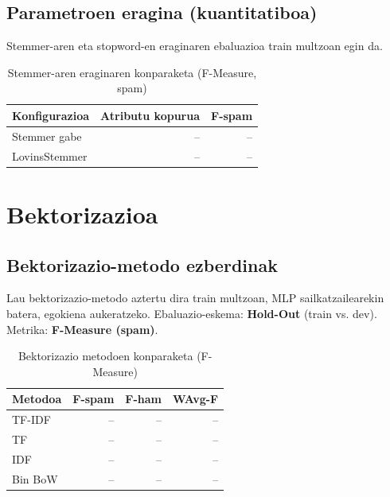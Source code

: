 \documentclass[12pt, a4paper]{article}
\begin{document}
\subsection{Parametroen eragina (kuantitatiboa)}

Stemmer-aren eta stopword-en eraginaren ebaluazioa train multzoan egin da.


\begin{table}[H]
    \centering
    \caption{Stemmer-aren eraginaren konparaketa (F-Measure, spam)}
    \begin{tabular}{lrr}
        \toprule
        \textbf{Konfigurazioa} & \textbf{Atributu kopurua} & \textbf{F-spam} \\
        \midrule
        Stemmer gabe  & -- & -- \\
        LovinsStemmer & -- & -- \\
        \bottomrule
    \end{tabular}
    \label{tab:stemmer}
\end{table}

\newpage
\section{Bektorizazioa}

\subsection{Bektorizazio-metodo ezberdinak}

Lau bektorizazio-metodo aztertu dira train multzoan, MLP sailkatzailearekin batera,
egokiena aukeratzeko. Ebaluazio-eskema: \textbf{Hold-Out} (train vs. dev).
Metrika: \textbf{F-Measure (spam)}.

\begin{table}[H]
    \centering
    \caption{Bektorizazio metodoen konparaketa (F-Measure)}
    \begin{tabular}{lrrr}
        \toprule
        \textbf{Metodoa} & \textbf{F-spam} & \textbf{F-ham} & \textbf{WAvg-F} \\
        \midrule
        TF-IDF   & -- & -- & -- \\
        TF       & -- & -- & -- \\
        IDF      & -- & -- & -- \\
        Bin BoW  & -- & -- & -- \\
        \bottomrule
    \end{tabular}
    \label{tab:bektorizazio}
\end{table}
\end{document}
